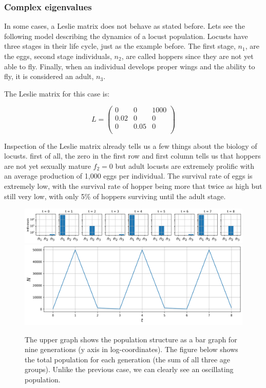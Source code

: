 \documentclass[12pt]{article}
\begin{document}
\subsubsection{Complex eigenvalues}

In some cases, a Leslie matrix does not behave as stated before. Lets see the following model describing the dynamics of a locust population. Locusts have three stages in their life cycle, just as the example before. The first stage, $n_1$, are the eggs, second stage individuals, $n_2$, are called hoppers since they are not yet able to fly. Finally, when an individual develops proper wings and the ability to fly, it is considered an adult, $n_3$.

The Leslie matrix for this case is:

\begin{equation}
L=\begin{pmatrix}
	0	&0	&1000	\\
	0.02	&0	&0	\\
	0	&0.05	&0	\\
\end{pmatrix}
\end{equation}

Inspection of the Leslie matrix already tells us a few things about the biology of locusts. first of all, the zero in the first row and first column tells us that hoppers are not yet sexually mature $f_2=0$ but adult locusts are extremely prolific with an average production of 1,000 eggs per individual. The survival rate of eggs is extremely low, with the survival rate of hopper being more that twice as high but still very low, with only 5\% of hoppers surviving until the adult stage.

\begin{figure}
	\begin{center}
		\includegraphics[width=\textwidth]{locusts_evol}
		\includegraphics[width=\textwidth]{tot_locusts_evol}		
	\end{center}
	\caption{The upper graph shows the population structure as a bar graph for nine generations (y axis in log-coordinates). The figure below shows the total population for each generation (the sum of all three age groups). Unlike the previous case, we can clearly see an oscillating population.}
	\label{fig:Llocusts}
\end{figure}
\end{document}
